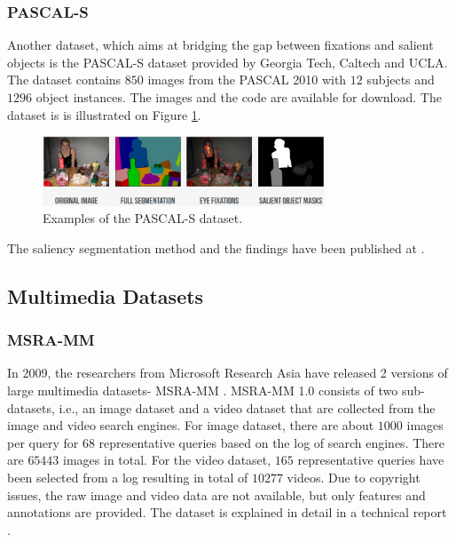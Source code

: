 \subsubsection{PASCAL-S}
Another dataset, which aims at bridging the gap between fixations and salient objects is the PASCAL-S dataset \cite{pascal-s_db} provided by Georgia Tech, Caltech and UCLA. The dataset contains $850$ images from the PASCAL 2010 with $12$ subjects and $1296$ object instances. The images and the code are available for download. The dataset is is illustrated on Figure \ref{fig:pascal-s}.

\begin{figure}[H]
\begin{center}
\includegraphics[width=0.75\textwidth]{fig/PASCAL-S}
\end{center}
\caption{Examples of the PASCAL-S dataset.}
\label{fig:pascal-s}
\end{figure}


The saliency segmentation method and the findings have been published at \cite{TPAMI.2012.147}.  

\subsection{Multimedia Datasets}
\subsubsection{MSRA-MM}
In 2009, the researchers from Microsoft Research Asia have released 2 versions of large multimedia datasets- MSRA-MM \cite{msra-mm_db}. MSRA-MM 1.0 consists of two sub-datasets, i.e., an image dataset and a video dataset that are collected from the image and video search engines. For image dataset, there are about $1000$ images per query for $68$ representative queries based on the log of search engines. There are $65443$ images in total. For the video dataset, $165$ representative queries have been selected from a log resulting in total of $10277$ videos. Due to copyright issues, the raw image and video data are not available, but only features and annotations are provided. The dataset is explained in detail in a technical report \cite{export:79942}.

